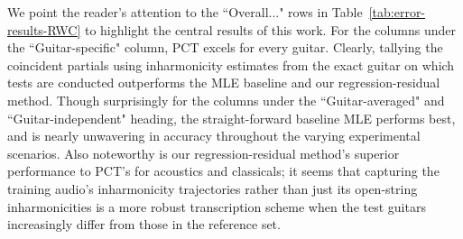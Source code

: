 \documentclass[12pt]{cmuthesis}
\begin{document}
We point the reader's attention to the ``Overall..." rows in Table~\ref{tab:error-results-RWC} to highlight the central results of this work. For the columns under the ``Guitar-specific" column, PCT excels for every guitar. Clearly, tallying the coincident partials using inharmonicity estimates from the exact guitar on which tests are conducted outperforms the MLE baseline and our regression-residual method. Though surprisingly for the columns under the ``Guitar-averaged" and ``Guitar-independent" heading, the straight-forward baseline MLE performs best, and is nearly unwavering in accuracy throughout the varying experimental scenarios. Also noteworthy is our regression-residual method's superior performance to PCT's for acoustics and classicals; it seems that capturing the training audio's inharmonicity trajectories rather than just its open-string inharmonicities is a more robust transcription scheme when the test guitars increasingly differ from those in the reference set.
\end{document}

